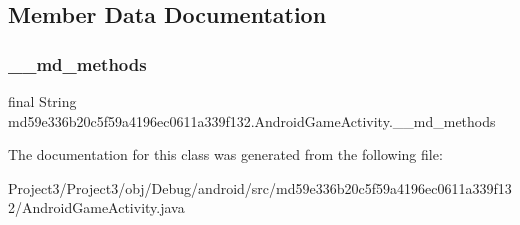 \subsection{Member Data Documentation}
\mbox{\label{classmd59e336b20c5f59a4196ec0611a339f132_1_1AndroidGameActivity_a05f6fdbe6c70591e3f9b2d7db21c1f56}} 
\subsubsection{\texorpdfstring{\+\_\+\+\_\+md\+\_\+methods}{\_\_md\_methods}}
{\footnotesize\ttfamily final String md59e336b20c5f59a4196ec0611a339f132.\+Android\+Game\+Activity.\+\_\+\+\_\+md\+\_\+methods\hspace{0.3cm}{\ttfamily [static]}}



The documentation for this class was generated from the following file\+:\begin{DoxyCompactItemize}
\item 
Project3/\+Project3/obj/\+Debug/android/src/md59e336b20c5f59a4196ec0611a339f132/Android\+Game\+Activity.\+java\end{DoxyCompactItemize}
